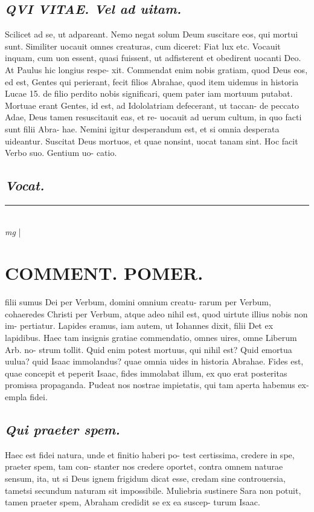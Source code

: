 \documentclass{article}
\begin{document}
\begin{pages}
\subsection*{\textit{QVI VITAE. Vel ad uitam.  }}\pstart Scilicet ad se, ut adpareant. Nemo negat solum Deum suscitare eos, qui mortui sunt. Similiter uocauit omnes creaturas, cum diceret: Fiat lux etc. Vocauit inquam, cum uon essent, quasi fuissent, ut adfisterent et obedirent uocanti Deo. At Paulus hic longius respe- xit. Commendat enim nobis gratiam, quod Deus eos, ed est, Gentes qui perierant, fecit filios Abrahae, quod item uidemus in historia Lucae 15. de filio perdito nobis significari, quem pater iam mortuum putabat. Mortuae erant Gentes, id est, ad Idololatriam defecerant, ut taccan- de peccato Adae, Deus tamen resuscitauit eas, et re- uocauit ad uerum cultum, in quo facti sunt filii Abra- hae. Nemini igitur desperandum est, et si omnia desperata uideantur. Suscitat Deus mortuos, et quae nonsint, uocat tanam sint. Hoc facit Verbo suo. Gentium uo- catio.   \pend
{}
{}
\subsection*{\textit{Vocat. }}
\vspace{0.5cm}\noindent
\vspace{0.2cm}\rule{1cm}{0.2pt}\\ 
\hspace{0.2cm}\textit{mg}
\footnotesize 
\normalsize| 
\section*{COMMENT. POMER.  }\pstart filii sumus Dei per Verbum, domini omnium creatu- rarum per Verbum, cohaeredes Christi per Verbum, atque adeo nihil est, quod uirtute illius nobis non im- pertiatur. Lapides eramus, iam autem, ut Iohannes dixit, filii Det ex lapidibus. Haec tam insignis gratiae commendatio, omnes uires, omne Liberum Arb. no- strum tollit. Quid enim potest mortuus, qui nihil est? Quid emortua uulua? quid Isaac immolandus? quae omnia uides in historia Abrahae. Fides est, quae concepit et peperit Isaac, fides immolabat illum, ex quo erat posteritas promissa propaganda. Pudeat nos nostrae impietatis, qui tam aperta habemus ex- empla fidei.   \pend
{}
{}
\subsection*{\textit{Qui praeter spem. }}\pstart Haec est fidei natura, unde et finitio haberi po- test certissima, credere in spe, praeter spem, tam con- stanter nos credere oportet, contra omnem naturae sensum, ita, ut si Deus ignem frigidum dicat esse, credam sine controuersia, tametsi secundum naturam sit impossibile. Muliebria sustinere Sara non potuit, tamen praeter spem, Abraham credidit se ex ea suscep- turum Isaac.   \pend
{}
{}

\end{pages}
\end{document}
